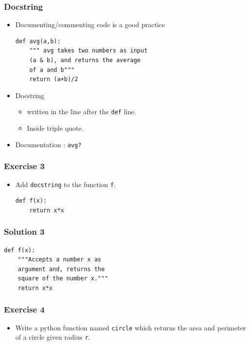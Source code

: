 \documentclass[17pt]{beamer}
\begin{document}
\begin{frame}[fragile]
\frametitle{Docstring}
\label{sec-8}

\begin{itemize}
\item Documenting/commenting code is a good practice\pause
\lstset{language=Python}
\begin{footnotesize}
\begin{lstlisting}
def avg(a,b):
    """ avg takes two numbers as input 
    (a & b), and returns the average 
    of a and b"""
    return (a+b)/2
\end{lstlisting}\pause
\end{footnotesize}
\item Docstring
\begin{itemize}
\item written in the line after the \texttt{def} line.\pause
\item Inside triple quote.\pause
\end{itemize}
\item Documentation :  
     \texttt{avg?}
\end{itemize}
\end{frame}
\begin{frame}[fragile]
\frametitle{Exercise 3}
\label{sec-9}
\begin{itemize}
\item Add \texttt{docstring} to the function \texttt{f}.

\lstset{language=Python}
\begin{lstlisting}
def f(x):
    return x*x
\end{lstlisting}
\end{itemize}
\end{frame}
\begin{frame}[fragile]
\frametitle{Solution 3}
\label{sec-10}

\lstset{language=Python}
\begin{lstlisting}
def f(x):
    """Accepts a number x as 
    argument and, returns the
    square of the number x."""
    return x*x
\end{lstlisting}
\end{frame}
\begin{frame}
\frametitle{Exercise 4}
\label{sec-11}

\begin{itemize}
\item Write a python function named \texttt{circle} which returns the area and
  perimeter of a circle given radius \texttt{r}.
\end{itemize}
\end{frame}
\end{document}
